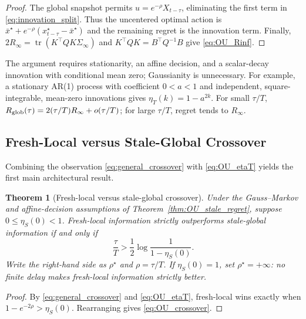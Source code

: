\documentclass[11pt]{article}
\newtheorem{theorem}{Theorem}
\begin{document}
\begin{proof}
The global snapshot permits $u=e^{-\rho}X_{t-\tau}$, eliminating the first
term in \eqref{eq:innovation_split}. Thus the uncentered optimal action is
$\bar x^\star+e^{-\rho}(x_{t-\tau}^\star-\bar x^\star)$ and the remaining
regret is the innovation term. Finally,
$2R_\infty=\operatorname{tr}(K^\top QK\Sigma_\infty)$ and
$K^\top QK=B^\top Q^{-1}B$ give \eqref{eq:OU_Rinf}.
\end{proof}

The argument requires stationarity, an affine decision, and a scalar-decay
innovation with conditional mean zero; Gaussianity is unnecessary. For example,
a stationary AR(1) process with coefficient $0<a<1$ and independent,
square-integrable, mean-zero innovations gives $\eta_T(k)=1-a^{2k}$.
For small $\tau/T$, $R_{\rm glob}(\tau)=2(\tau/T)R_\infty+o(\tau/T)$;
for large $\tau/T$, regret tends to $R_\infty$.

\subsection{Fresh-Local versus Stale-Global Crossover}
\label{subsec:OU_crossover}

Combining the observation \eqref{eq:general_crossover} with
\eqref{eq:OU_etaT} yields the first main architectural result.

\begin{theorem}[Fresh-local versus stale-global crossover]
\label{thm:local_global_crossover}
Under the Gauss--Markov and affine-decision assumptions of
Theorem~\ref{thm:OU_stale_regret}, suppose
$0\le\eta_S(0)<1$. Fresh-local information strictly
outperforms stale-global information if and only if
\begin{equation}
    \boxed{
    \frac{\tau}{T}
    >
    \frac{1}{2}
    \log
    \frac{1}{1-\eta_S(0)}.
    }
    \label{eq:OU_crossover}
\end{equation}
Write the right-hand side as $\rho^\star$ and $\rho=\tau/T$.
If $\eta_S(0)=1$, set $\rho^\star=+\infty$: no finite delay makes fresh-local
information strictly better.

\end{theorem}

\begin{proof}
By \eqref{eq:general_crossover} and \eqref{eq:OU_etaT}, fresh-local wins
exactly when $1-e^{-2\rho}>\eta_S(0)$. Rearranging gives
\eqref{eq:OU_crossover}.
\end{proof}
\end{document}
